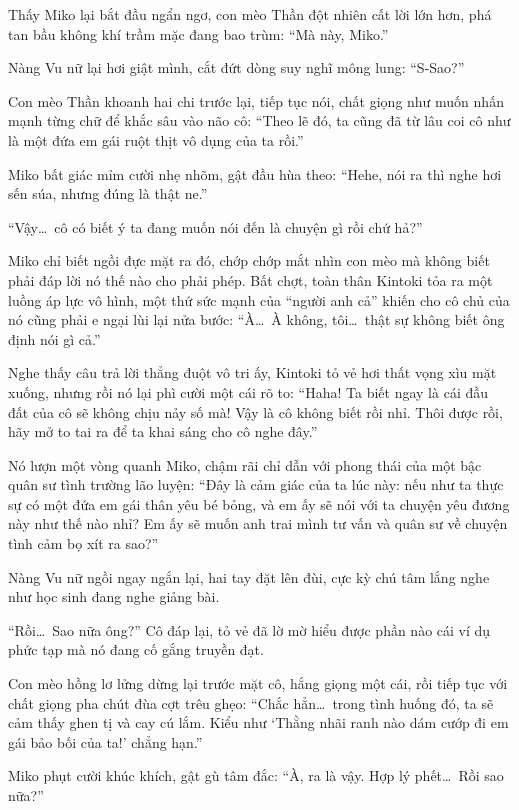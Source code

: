 \documentclass[../main.tex]{subfiles}
\begin{document}
Thấy Miko lại bắt đầu ngẩn ngơ, con mèo Thần đột nhiên cất lời lớn hơn, phá tan bầu không khí trầm mặc đang bao trùm: ``Mà này, Miko.''

Nàng Vu nữ lại hơi giật mình, cắt đứt dòng suy nghĩ mông lung: ``S-Sao?''

Con mèo Thần khoanh hai chi trước lại, tiếp tục nói, chất giọng như muốn nhấn mạnh từng chữ để khắc sâu vào não cô: ``Theo lẽ đó, ta cũng đã từ lâu coi cô như là một đứa em gái ruột thịt vô dụng của ta rồi.''

Miko bất giác mỉm cười nhẹ nhõm, gật đầu hùa theo: ``Hehe, nói ra thì nghe hơi sến súa, nhưng đúng là thật ne.''

``Vậy\dots\ cô có biết ý ta đang muốn nói đến là chuyện gì rồi chứ hả?''

Miko chỉ biết ngồi đực mặt ra đó, chớp chớp mắt nhìn con mèo mà không biết phải đáp lời nó thế nào cho phải phép. Bất chợt, toàn thân Kintoki tỏa ra một luồng áp lực vô hình, một thứ sức mạnh của ``người anh cả'' khiến cho cô chủ của nó cũng phải e ngại lùi lại nửa bước: ``À\dots\ À không, tôi\dots\ thật sự không biết ông định nói gì cả.''

Nghe thấy câu trả lời thẳng đuột vô tri ấy, Kintoki tỏ vẻ hơi thất vọng xìu mặt xuống, nhưng rồi nó lại phì cười một cái rõ to: ``Haha! Ta biết ngay là cái đầu đất của cô sẽ không chịu nảy số mà! Vậy là cô không biết rồi nhỉ. Thôi được rồi, hãy mở to tai ra để ta khai sáng cho cô nghe đây.''

Nó lượn một vòng quanh Miko, chậm rãi chỉ dẫn với phong thái của một bậc quân sư tình trường lão luyện: ``Đây là cảm giác của ta lúc này: nếu như ta thực sự có một đứa em gái thân yêu bé bỏng, và em ấy sẽ nói với ta chuyện yêu đương này như thế nào nhỉ? Em ấy sẽ muốn anh trai mình tư vấn và quân sư về chuyện tình cảm bọ xít ra sao?''

Nàng Vu nữ ngồi ngay ngắn lại, hai tay đặt lên đùi, cực kỳ chú tâm lắng nghe như học sinh đang nghe giảng bài.


``Rồi\dots\ Sao nữa ông?'' Cô đáp lại, tỏ vẻ đã lờ mờ hiểu được phần nào cái ví dụ phức tạp mà nó đang cố gắng truyền đạt.

Con mèo hồng lơ lửng dừng lại trước mặt cô, hắng giọng một cái, rồi tiếp tục với chất giọng pha chút đùa cợt trêu ghẹo: ``Chắc hẳn\dots\ trong tình huống đó, ta sẽ cảm thấy ghen tị và cay cú lắm. Kiểu như `Thằng nhãi ranh nào dám cướp đi em gái bảo bối của ta!' chẳng hạn.''

Miko phụt cười khúc khích, gật gù tâm đắc: ``À, ra là vậy. Hợp lý phết\dots\ Rồi sao nữa?''
\end{document}

